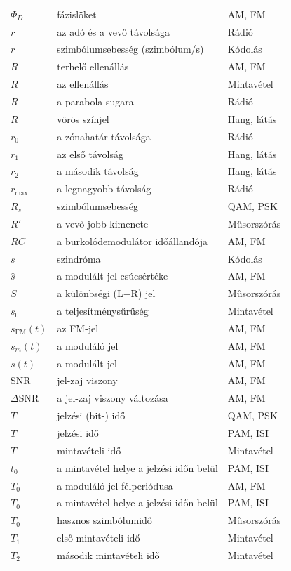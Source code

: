 {\begin{longtable}{@{}>{\raggedright\arraybackslash}p{2.4cm}>{\raggedright\arraybackslash}p{8.2cm}>{\raggedright\arraybackslash}p{3.8cm}@{}}
$\Phi_D$ & fázislöket & AM, FM\\
$r$ & az adó és a vevő távolsága & Rádió\\
$r$ & szimbólumsebesség (szimbólum/s) & Kódolás\\
$R$ & terhelő ellenállás & AM, FM\\
$R$ & az ellenállás & Mintavétel\\
$R$ & a parabola sugara & Rádió\\
$R$ & vörös színjel & Hang, látás\\
$r_0$ & a zónahatár távolsága & Rádió\\
$r_1$ & az első távolság & Hang, látás\\
$r_2$ & a második távolság & Hang, látás\\
$r_{\max}$ & a legnagyobb távolság & Rádió\\
$R_s$ & szimbólumsebesség & QAM, PSK\\
$R'$ & a vevő jobb kimenete & Műsorszórás\\
$RC$ & a burkolódemodulátor időállandója & AM, FM\\
$s$ & szindróma & Kódolás\\
$\hat s$ & a modulált jel csúcsértéke & AM, FM\\
$S$ & a különbségi (L$-$R) jel & Műsorszórás\\
$s_0$ & a teljesítménysűrűség & Mintavétel\\
$s_\mathrm{FM}(t)$ & az FM-jel & AM, FM\\
$s_m(t)$ & a moduláló jel & AM, FM\\
$s(t)$ & a modulált jel & AM, FM\\
$\text{SNR}$ & jel-zaj viszony & AM, FM\\
$\Delta\text{SNR}$ & a jel-zaj viszony változása & AM, FM\\
$T$ & jelzési (bit-) idő & QAM, PSK\\
$T$ & jelzési idő & PAM, ISI\\
$T$ & mintavételi idő & Mintavétel\\
$t_0$ & a mintavétel helye a jelzési időn belül & PAM, ISI\\
$T_0$ & a moduláló jel félperiódusa & AM, FM\\
$T_0$ & a mintavétel helye a jelzési időn belül & PAM, ISI\\
$T_0$ & hasznos szimbólumidő & Műsorszórás\\
$T_1$ & első mintavételi idő & Mintavétel\\
$T_2$ & második mintavételi idő & Mintavétel\\

\end{longtable}}
